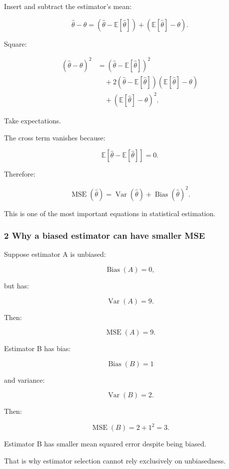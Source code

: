 Insert and subtract the estimator's mean:

\[
 \widehat\theta-\theta = (\widehat\theta-\mathbb E[\widehat\theta]) + (\mathbb E[\widehat\theta]-\theta).
\]

Square:

\[
 \begin{aligned} (\widehat\theta-\theta)^2 &= (\widehat\theta-\mathbb E[\widehat\theta])^2\\ &\quad+ 2(\widehat\theta-\mathbb E[\widehat\theta]) (\mathbb E[\widehat\theta]-\theta)\\ &\quad+ (\mathbb E[\widehat\theta]-\theta)^2. \end{aligned}
\]

Take expectations.

The cross term vanishes because:

\[
 \mathbb E[ \widehat\theta-\mathbb E[\widehat\theta] ]=0.
\]

Therefore:

\[
 \boxed{ \operatorname{MSE}(\widehat\theta) = \operatorname{Var}(\widehat\theta) + \operatorname{Bias}(\widehat\theta)^2 }.
\]

This is one of the most important equations in statistical estimation.

\subsubsection{2 Why a biased estimator can have smaller MSE}\label{02-foundations-ii-ch030-why-a-biased-estimator-can-have-smaller-mse}

Suppose estimator A is unbiased:

\[
 \operatorname{Bias}(A)=0,
\]

but has:

\[
 \operatorname{Var}(A)=9.
\]

Then:

\[
 \operatorname{MSE}(A)=9.
\]

Estimator B has bias:

\[
 \operatorname{Bias}(B)=1
\]

and variance:

\[
 \operatorname{Var}(B)=2.
\]

Then:

\[
 \operatorname{MSE}(B)=2+1^2=\boxed3.
\]

Estimator B has smaller mean squared error despite being biased.

That is why estimator selection cannot rely exclusively on unbiasedness.

